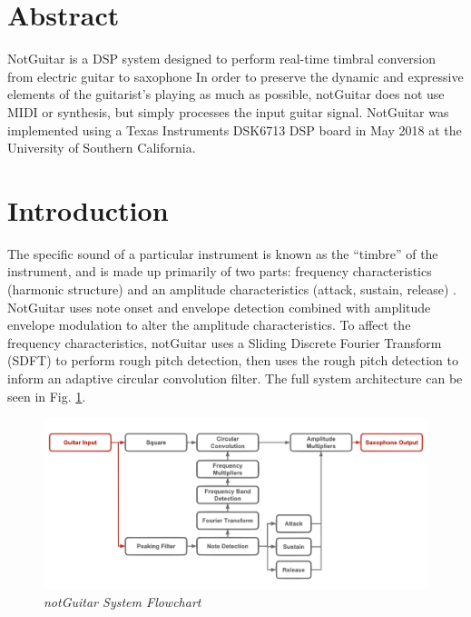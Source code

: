 \documentclass[twoside,a4paper]{article}
\title{\papertitle}
\newif\ifpdf
\begin{document}
\ifpdf %
  \DeclareGraphicsExtensions{.png,.jpg,.pdf}
\else  %
\fi

\maketitle
\section{Abstract}
NotGuitar is a DSP system designed to perform real-time timbral conversion from electric guitar to saxophone
In order to preserve the dynamic and expressive elements of the guitarist's playing as much as possible,
notGuitar does not use MIDI or synthesis, but simply processes the input guitar signal. 
NotGuitar was implemented using a Texas Instruments DSK6713 DSP board in May 2018 at the University of
Southern California.

\section{Introduction}
The specific sound of a particular instrument is known as the ``timbre'' of
the instrument, and is made up primarily of two parts: frequency characteristics
(harmonic structure) and an amplitude characteristics (attack, sustain, release)
\cite{Zolzer:2011:DDA:2028616}. NotGuitar uses note onset and envelope detection combined with
amplitude envelope modulation to alter the amplitude characteristics.
To affect the frequency characteristics, notGuitar uses a Sliding Discrete Fourier Transform (SDFT)
to perform rough pitch detection, then uses the rough pitch detection
to inform an adaptive circular convolution filter.
The full system architecture can be seen in Fig. \ref{flowchart}.

\begin{figure}[ht]
  \center
  \includegraphics[width=5in]{Pictures/FlowChart.png}
  \caption{\label{flowchart}{\it notGuitar System Flowchart}}
  \end{figure}
\end{document}
